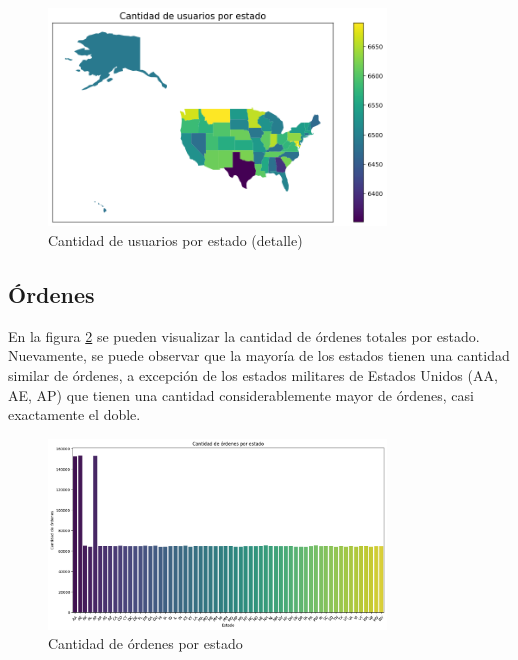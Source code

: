 \begin{figure}[H]
    \centering
    \includegraphics[width=0.8\textwidth]{imagenes/datos_uniformes/usuarios_por_estado_closer.png}
    \caption{Cantidad de usuarios por estado (detalle)}
    \label{fig:usuarios_por_estado_closer}
\end{figure}

\subsection{Órdenes}

En la figura \ref{fig:ordenes_por_estado} se pueden visualizar la cantidad de órdenes totales por estado. Nuevamente, se puede observar que la mayoría de los estados tienen una cantidad similar de órdenes, a excepción de los estados militares de Estados Unidos (AA, AE, AP) que tienen una cantidad considerablemente mayor de órdenes, casi exactamente el doble.

\begin{figure}[H]
    \centering
    \includegraphics[width=0.8\textwidth]{imagenes/datos_uniformes/ordenes_por_estado.png}
    \caption{Cantidad de órdenes por estado}
    \label{fig:ordenes_por_estado}
\end{figure}

